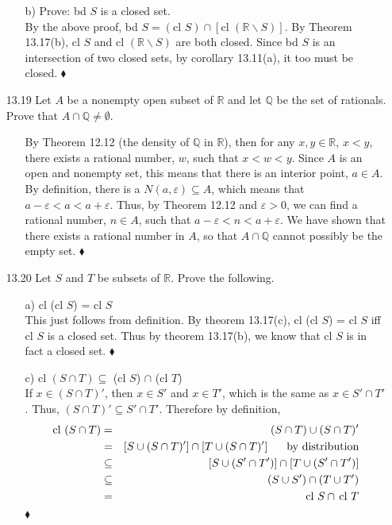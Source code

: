 \documentclass[12pt]{article}
\begin{document}
\begin{enumerate}
\begin{enumerate}
\item[b)] Prove: bd $S$ is a closed set. \\
By the above proof, bd $S = (\mbox{cl } S) \cap [\mbox{cl }(\mathbb{R}\backslash S)]$. 
By Theorem 13.17(b), $\mbox{cl } S$ and $\mbox{cl }(\mathbb{R}\backslash S)$ are both closed.
Since bd $S$ is an intersection of two closed sets, by corollary 13.11(a), it too must be closed.
$\blacklozenge$
\end{enumerate}

\item[13.19] Let $A$ be a nonempty open subset of $\mathbb{R}$ and let $\mathbb{Q}$ be the set of rationals. Prove that $A \cap \mathbb{Q} \neq \emptyset$.
\begin{enumerate}
\item[] By Theorem 12.12 (the density of $\mathbb{Q}$ in $\mathbb{R}$), then for any $x, y \in \mathbb{R}$, $x < y$, there exists a rational number, $w$, such that $x < w < y$. Since $A$ is an open and nonempty set, this means that there is an interior point, $a \in A$. By definition, there is a $N(a, \varepsilon) \subseteq A$, which means that $a - \varepsilon < a < a + \varepsilon$. Thus, by Theorem 12.12 and $\varepsilon > 0$, we can find a rational number, $n \in A$, such that $a - \varepsilon < n < a + \varepsilon$. We have shown that there exists a rational number in $A$, so that $A \cap \mathbb{Q}$ cannot possibly be the empty set. $\blacklozenge$
\end{enumerate}

\item[13.20] Let $S$ and $T$ be subsets of $\mathbb{R}$. Prove the following.
\begin{enumerate}
\item[a)] cl (cl $S$) = cl $S$ \\
This just follows from definition. By theorem 13.17(c), cl (cl $S$) = cl $S$ iff 
cl $S$ is a closed set. Thus by theorem 13.17(b), we know that cl $S$ is in fact a closed set.
$\blacklozenge$

\item[c)] cl $(S \cap T) \subseteq$ (cl $S$) $\cap$ (cl $T$) \\
If $x \in (S \cap T)'$, then $x \in S'$ and $x \in T'$, which is the same as $x \in S' \cap T'$.
Thus, $(S \cap T)' \subseteq S' \cap T'$. Therefore by definition, 
\begin{eqnarray*}
\mbox{cl } (S \cap T) &=& (S \cap T) \cup (S \cap T)' \\
&=& [S \cup (S \cap T)'] \cap [T \cup (S \cap T)'] \hskip .6cm \mbox{by distribution}\\
&\subseteq & [S \cup (S' \cap T')] \cap [T \cup (S' \cap T')] \\
&\subseteq & (S \cup S') \cap (T \cup T') \\
&=& \mbox{cl } S \cap\, \mbox{cl } T
\end{eqnarray*}
\hskip 14.0cm $\blacklozenge$


\end{enumerate}
\end{enumerate}
\end{document}
